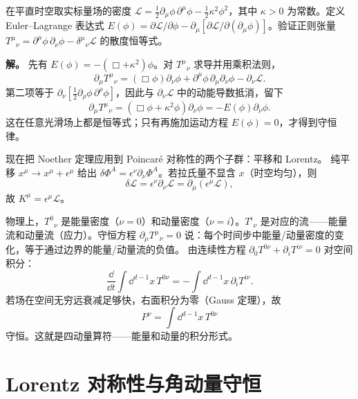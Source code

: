 \begin{workedexample}[平移不变性与应力能量守恒]
在平直时空取实标量场的密度 \(\mathcal L=\tfrac12\partial_\mu\phi\,\partial^\mu\phi-\tfrac12\kappa^2\phi^2\)，其中 \(\kappa>0\) 为常数。定义 Euler--Lagrange 表达式 \(E(\phi)=\partial\mathcal L/\partial\phi-\partial_\mu[\partial\mathcal L/\partial(\partial_\mu\phi)]\)。验证正则张量 \(T^\mu{}_\nu=\partial^\mu\phi\,\partial_\nu\phi-\delta^\mu{}_\nu\mathcal L\) 的散度恒等式。

\textbf{解。} 先有 \(E(\phi)=-(\Box+\kappa^2)\phi\)。对 \(T^\mu{}_\nu\) 求导并用乘积法则，
\[
\partial_\mu T^\mu{}_\nu
=(\Box\phi)\partial_\nu\phi
+\partial^\mu\phi\,\partial_\mu\partial_\nu\phi
-\partial_\nu\mathcal L.
\]
第二项等于 \(\partial_\nu[\tfrac12\partial_\rho\phi\,\partial^\rho\phi]\)，因此与 \(\partial_\nu\mathcal L\) 中的动能导数抵消，留下
\[
\partial_\mu T^\mu{}_\nu
=(\Box\phi+\kappa^2\phi)\partial_\nu\phi
=-E(\phi)\partial_\nu\phi.
\]
这在任意光滑场上都是恒等式；只有再施加运动方程 \(E(\phi)=0\)，才得到守恒律。

\end{workedexample}


现在把 Noether 定理应用到 Poincaré 对称性的两个子群：平移和 Lorentz。
纯平移 $x^\mu\to x^\mu+\epsilon^\mu$ 给出 $\delta\Phi^A=\epsilon^\nu\partial_\nu\Phi^A$。若拉氏量不显含 $x$（时空均匀），则
\begin{equation*}
\delta\mathcal{L}=\epsilon^\nu\partial_\nu\mathcal{L}=\partial_\mu(\epsilon^\mu\mathcal{L}),
\end{equation*}
故 $K^\mu=\epsilon^\mu\mathcal{L}$。

物理上，$T^{0}{}_\nu$ 是能量密度（$\nu=0$）和动量密度（$\nu=i$）。$T^{i}{}_\nu$ 是对应的流——能量流和动量流（应力）。守恒方程 $\partial_\mu T^\mu{}_\nu=0$ 说：每个时间步中能量/动量密度的变化，等于通过边界的能量/动量流的负值。
由连续性方程 $\partial_0 T^{0\nu}+\partial_i T^{i\nu}=0$ 对空间积分：
\begin{equation*}
\frac{\dd}{\dd t}\int \dd^{d-1}x\,T^{0\nu}=-\int \dd^{d-1}x\,\partial_i T^{i\nu}.
\end{equation*}
若场在空间无穷远衰减足够快，右面积分为零（Gauss 定理），故
\begin{equation*}\boxed{P^\nu=\int \dd^{d-1}x\,T^{0\nu}}
\end{equation*}
守恒。这就是四动量算符——能量和动量的积分形式。

\section{Lorentz 对称性与角动量守恒}

